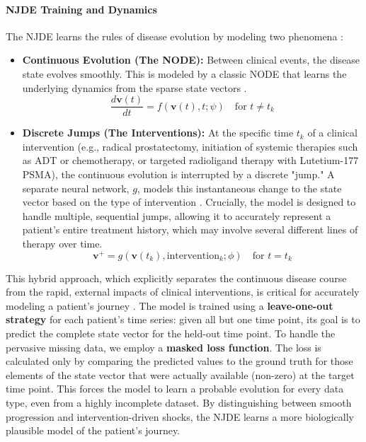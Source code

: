 \documentclass[11pt, a4paper]{article}
\begin{document}
\paragraph{NJDE Training and Dynamics}
The NJDE learns the rules of disease evolution by modeling two phenomena \cite{GwakSim2020}:
\begin{itemize}
    \item \textbf{Continuous Evolution (The NODE):} Between clinical events, the disease state evolves smoothly. This is modeled by a classic NODE that learns the underlying dynamics from the sparse state vectors \cite{BergHasenclever2018}.
    $$ \frac{d\mathbf{v}(t)}{dt} = f(\mathbf{v}(t), t; \psi) \quad \text{for } t \neq t_k $$
    \item \textbf{Discrete Jumps (The Interventions):} At the specific time $t_k$ of a clinical intervention (e.g., radical prostatectomy, initiation of systemic therapies such as ADT or chemotherapy, or targeted radioligand therapy with Lutetium-177 PSMA), the continuous evolution is interrupted by a discrete "jump." A separate neural network, $g$, models this instantaneous change to the state vector based on the type of intervention \cite{CuchieroLarsson2019, AbushaqraXue2022}. Crucially, the model is designed to handle multiple, sequential jumps, allowing it to accurately represent a patient's entire treatment history, which may involve several different lines of therapy over time.
    $$ \mathbf{v}^+ = g(\mathbf{v}(t_k), \text{intervention}_k; \phi) \quad \text{for } t = t_k $$
\end{itemize}
This hybrid approach, which explicitly separates the continuous disease course from the rapid, external impacts of clinical interventions, is critical for accurately modeling a patient's journey \cite{GwakSim2020}. The model is trained using a \textbf{leave-one-out strategy} for each patient's time series: given all but one time point, its goal is to predict the complete state vector for the held-out time point. To handle the pervasive missing data, we employ a \textbf{masked loss function}. The loss is calculated only by comparing the predicted values to the ground truth for those elements of the state vector that were actually available (non-zero) at the target time point. This forces the model to learn a probable evolution for every data type, even from a highly incomplete dataset. By distinguishing between smooth progression and intervention-driven shocks, the NJDE learns a more biologically plausible model of the patient's journey.
\end{document}
